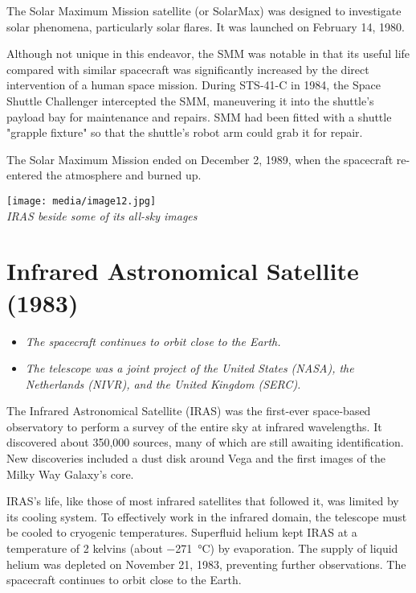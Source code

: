 The Solar Maximum Mission satellite (or SolarMax) was designed to
investigate solar phenomena, particularly solar flares. It was launched
on February 14, 1980.

Although not unique in this endeavor, the SMM was notable in that its
useful life compared with similar spacecraft was significantly increased
by the direct intervention of a human space mission. During STS-41-C in
1984, the Space Shuttle Challenger intercepted the SMM, maneuvering it
into the shuttle's payload bay for maintenance and repairs. SMM had been
fitted with a shuttle "grapple fixture" so that the shuttle's robot arm
could grab it for repair.

The Solar Maximum Mission ended on December 2, 1989, when the spacecraft
re-entered the atmosphere and burned up.

\texttt{[image: media/image12.jpg]}\\
\emph{IRAS beside some of its all-sky images}

\section{Infrared Astronomical Satellite
(1983)}\label{infrared-astronomical-satellite-1983}

\begin{itemize}
\item
  \emph{The spacecraft continues to orbit close to the Earth.}
\item
  \emph{The telescope was a joint project of the United States (NASA),
  the Netherlands (NIVR), and the United Kingdom (SERC).}
\end{itemize}

The Infrared Astronomical Satellite (IRAS) was the first-ever
space-based observatory to perform a survey of the entire sky at
infrared wavelengths. It discovered about 350,000 sources, many of which
are still awaiting identification. New discoveries included a dust disk
around Vega and the first images of the Milky Way Galaxy's core.

IRAS's life, like those of most infrared satellites that followed it,
was limited by its cooling system. To effectively work in the infrared
domain, the telescope must be cooled to cryogenic temperatures.
Superfluid helium kept IRAS at a temperature of 2 kelvins (about
−271~°C) by evaporation. The supply of liquid helium was depleted on
November 21, 1983, preventing further observations. The spacecraft
continues to orbit close to the Earth.

